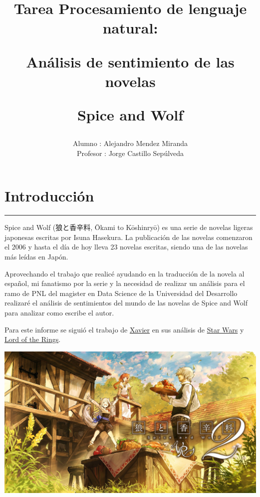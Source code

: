 \documentclass[
]{article}
\title{\textbf{Tarea Procesamiento de lenguaje natural:}

\textbf{Análisis de sentimiento de las novelas}

\textbf{Spice and Wolf}}
\author{Alumno : Alejandro Mendez Miranda\\
Profesor : Jorge Castillo Sepúlveda}
\date{}
\begin{document}
\maketitle

\renewcommand*\contentsname{\textbf{Índice}}
{
\setcounter{tocdepth}{2}
\tableofcontents
}
\hypertarget{introducciuxf3n}{%
\section{\texorpdfstring{\textbf{Introducción}}{Introducción}}\label{introducciuxf3n}}

\begin{center}\rule{0.5\linewidth}{0.5pt}\end{center}

Spice and Wolf (狼と香辛料, Ōkami to Kōshinryō) es una serie de novelas
ligeras japonesas escritas por Isuna Hasekura. La publicación de las
novelas comenzaron el 2006 y hasta el día de hoy lleva 23 novelas
escritas, siendo una de las novelas más leídas en Japón.

Aprovechando el trabajo que realicé ayudando en la traducción de la
novela al español, mi fanatismo por la serie y la necesidad de realizar
un análisis para el ramo de PNL del magister en Data Science de la
Universidad del Desarrollo realizaré el análisis de sentimientos del
mundo de las novelas de Spice and Wolf para analizar como escribe el
autor.

Para este informe se siguió el trabajo de
\href{https://www.kaggle.com/xvivancos}{Xavier} en sus análisis de
\href{https://www.kaggle.com/xvivancos/analyzing-star-wars-movie-scripts}{Star
Wars} y
\href{https://www.kaggle.com/xvivancos/analyzing-the-lord-of-the-rings-data}{Lord
of the Rings}.

\includegraphics{EisJLXFVkAAZN1c.jpg}
\end{document}
